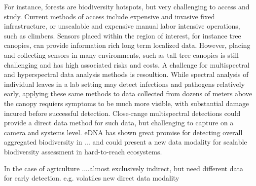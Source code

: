 For instance, forests are biodiversity hotspots, but very challenging to access and study. Current methods of access include expensive and invasive fixed infrastructure, or unscalable and expensive manual labor intensive operations, such as climbers. 
Sensors placed within the region of interest, for instance tree canopies, can provide information rich long term localized data. However, placing and collecting sensors in many environments, such as tall tree canopies is still challenging and has high associated risks and costs.
A challenge for multispectral and hyperspectral data analysis methods is resoultion. While spectral analysis of individual leaves in a lab setting may detect infections and pathogens relatively early, applying these same methods to data collected from dozens of meters above the canopy requiers symptoms to be much more visible, with substantial damage incured before successful detection. Close-range multispectral detections could provide a direct data method for such data, but challenging to capture on a camera and systems level.
eDNA has shown great promise for detecting overall aggregated biodiversity in ... and could present a new data modality for scalable biodiversity assessment in hard-to-reach ecosystems.


In the case of agriculture ....almost exclusively indirect, but need different  data for early detection. e.g. volatiles new direct data modality


